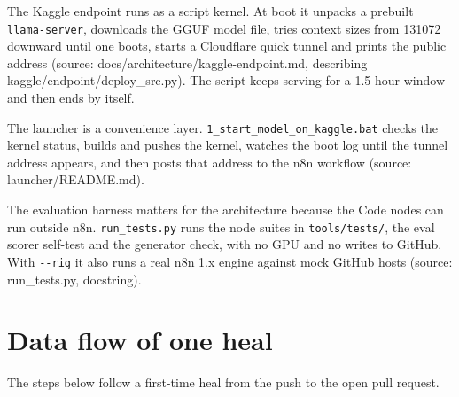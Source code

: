The Kaggle endpoint runs as a script kernel. At boot it unpacks a prebuilt \texttt{llama-\allowbreak{}server}, downloads the GGUF model file, tries context sizes from 131072 downward until one boots, starts a Cloudflare quick tunnel and prints the public address (source: docs/\allowbreak{}architecture/\allowbreak{}kaggle-endpoint.md, describing kaggle/\allowbreak{}endpoint/\allowbreak{}deploy\_\allowbreak{}src.py). The script keeps serving for a 1.5 hour window and then ends by itself.

The launcher is a convenience layer. \texttt{1\_\allowbreak{}start\_\allowbreak{}model\_\allowbreak{}on\_\allowbreak{}kaggle.\allowbreak{}bat} checks the kernel status, builds and pushes the kernel, watches the boot log until the tunnel address appears, and then posts that address to the n8n workflow (source: launcher/\allowbreak{}README.md).

The evaluation harness matters for the architecture because the Code nodes can run outside n8n. \texttt{run\_\allowbreak{}tests.\allowbreak{}py} runs the node suites in \texttt{tools/\allowbreak{}tests/\allowbreak{}}, the eval scorer self-test and the generator check, with no GPU and no writes to GitHub. With \texttt{-\allowbreak{}-\allowbreak{}rig} it also runs a real n8n 1.x engine against mock GitHub hosts (source: run\_\allowbreak{}tests.py, docstring).

\section{Data flow of one heal}



The steps below follow a first-time heal from the push to the open pull request.

